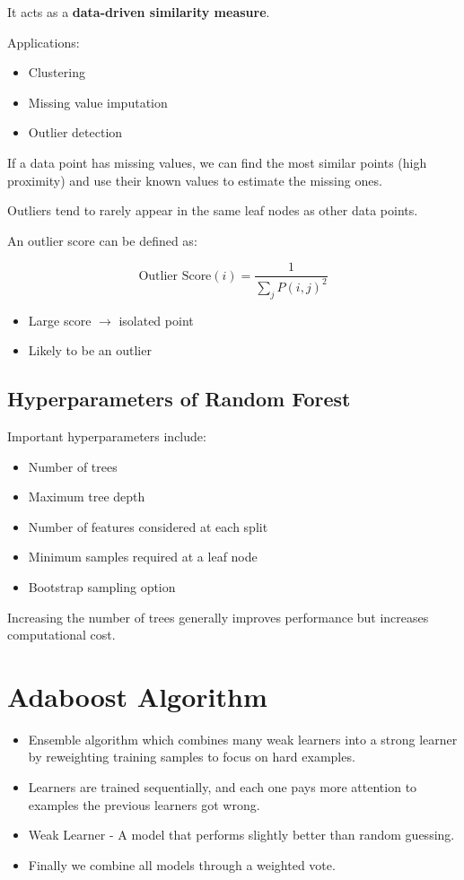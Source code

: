 \documentclass[10pt,a4paper]{article}
\begin{document}
		It acts as a \textbf{data-driven similarity measure}.
	
		Applications:
	
		\begin{itemize}
			\item Clustering
			\item Missing value imputation
			\item Outlier detection
		\end{itemize}
	
		If a data point has missing values, we can find the most similar points (high proximity) and use their known values to estimate the missing ones.
	
	
		Outliers tend to rarely appear in the same leaf nodes as other data points.
	
		An outlier score can be defined as:
	
	
			\[
			\text{Outlier Score}(i) =
			\frac{1}{\sum_j P(i,j)^2}
			\]
	
	
		\begin{itemize}
			\item Large score $\rightarrow$ isolated point
			\item Likely to be an outlier
		\end{itemize}
	
		\subsection{Hyperparameters of Random Forest}
	
		Important hyperparameters include:
	
		\begin{itemize}
			\item Number of trees
			\item Maximum tree depth
			\item Number of features considered at each split
			\item Minimum samples required at a leaf node
			\item Bootstrap sampling option
		\end{itemize}
	
		Increasing the number of trees generally improves performance but increases computational cost.
	
		\section{Adaboost Algorithm}
	
		\begin{itemize}
			\item Ensemble algorithm which combines many weak learners into a strong learner by reweighting training samples to focus on hard examples.
			\item Learners are trained sequentially, and each one pays more attention to examples the previous learners got wrong.
			\item Weak Learner - A model that performs slightly better than random guessing.
			\item Finally we combine all models through a weighted vote.
		\end{itemize}
	
\end{document}

